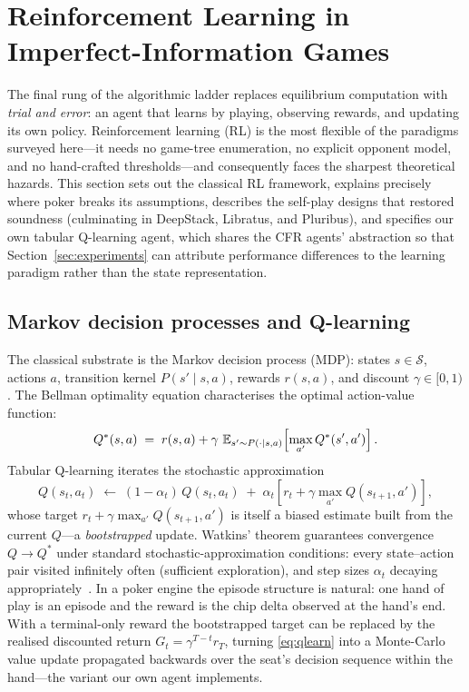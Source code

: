 \section{Reinforcement Learning in Imperfect-Information Games}\label{sec:rl}

The final rung of the algorithmic ladder replaces equilibrium computation with \emph{trial and error}: an agent that learns by playing, observing rewards, and updating its own policy. Reinforcement learning (RL) is the most flexible of the paradigms surveyed here---it needs no game-tree enumeration, no explicit opponent model, and no hand-crafted thresholds---and consequently faces the sharpest theoretical hazards. This section sets out the classical RL framework, explains precisely where poker breaks its assumptions, describes the self-play designs that restored soundness (culminating in DeepStack, Libratus, and Pluribus), and specifies our own tabular Q-learning agent, which shares the CFR agents' abstraction so that Section~\ref{sec:experiments} can attribute performance differences to the learning paradigm rather than the state representation.

\subsection{Markov decision processes and Q-learning}

The classical substrate is the Markov decision process (MDP): states $s \in \mathcal{S}$, actions $a$, transition kernel $P(s' \mid s, a)$, rewards $r(s,a)$, and discount $\gamma \in [0,1)$. The Bellman optimality equation characterises the optimal action-value function:
\begin{equation}\label{eq:bellman}
Q^{*}(s,a) \;=\; r(s,a) + \gamma\, \operatorname{\mathbb{E}}_{s' \sim P(\cdot \mid s,a)}\!\left[\max_{a'} Q^{*}(s',a')\right].
\end{equation}
Tabular Q-learning iterates the stochastic approximation
\begin{equation}\label{eq:qlearn}
Q(s_t, a_t) \;\leftarrow\; (1 - \alpha_t)\, Q(s_t, a_t) \;+\; \alpha_t \left[ r_t + \gamma \max_{a'} Q(s_{t+1}, a') \right],
\end{equation}
whose target $r_t + \gamma \max_{a'} Q(s_{t+1},a')$ is itself a biased estimate built from the current $Q$---a \emph{bootstrapped} update. Watkins' theorem guarantees convergence $Q \to Q^{*}$ under standard stochastic-approximation conditions: every state--action pair visited infinitely often (sufficient exploration), and step sizes $\alpha_t$ decaying appropriately~\cite{watkins1992q}. In a poker engine the episode structure is natural: one hand of play is an episode and the reward is the chip delta observed at the hand's end. With a terminal-only reward the bootstrapped target can be replaced by the realised discounted return $G_t = \gamma^{T-t} r_T$, turning \eqref{eq:qlearn} into a Monte-Carlo value update propagated backwards over the seat's decision sequence within the hand---the variant our own agent implements.

